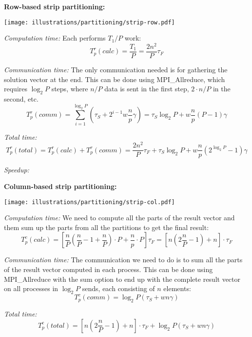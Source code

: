 \noindent\textbf{Row-based strip partitioning:}

\begin{center}
  \texttt{[image: illustrations/partitioning/strip-row.pdf]}
\end{center}

\emph{Computation time:} Each performs $T_1/P$ work:
\[
  T_p^r(calc) = \frac{T_1}{P} = \frac{2n^2}{P} \tau_F
\]

\emph{Communication time:} The only communication needed is for gathering the solution vector at the end. This can be done using MPI\_Allreduce, which requires $\log_2 P$ steps, where $n/P$ data is sent in the first step, $2\cdot n/P$ in the second, etc.
\[
  T_p^r(comm) = \sum_{i=1}^{\log_2 P} \left( \tau_S + 2^{i-1}w \frac{n}{p} \gamma \right)
  = \tau_S \log_2 P + w \frac{n}{p} \left( P-1 \right) \gamma
\]

\emph{Total time:}
\[
  T_p^r (total) = T_p^r(calc) + T_p^r(comm) =  \frac{2n^2}{P} \tau_F + \tau_S \log_2 P + w \frac{n}{p} \left( 2^{\log_2 P}-1 \right) \gamma
\]

\emph{Speedup:}









\noindent\textbf{Column-based strip partitioning:}

\begin{center}
  \texttt{[image: illustrations/partitioning/strip-col.pdf]}
\end{center}

\emph{Computation time:} We need to compute all the parts of the result vector and them sum up the parts from all the partitions to get the final result:
\[
  T_p^c(calc) = \left[ \frac{n}{P} \left( \frac{n}{P} - 1 + \frac{n}{P} \right) \cdot P + \frac{n}{p}\cdot P \right] \tau_F
  = \left[ n \left( 2 \frac{n}{P} - 1 \right) + n \right] \cdot \tau_F
\]

\emph{Communication time:} The communication we need to do is to sum all the parts of the result vector computed in each process. This can be done using MPI\_Allreduce with the sum option to end up with the complete result vector on all processes in $\log_2 P$ sends, each consisting of $n$ elements:
\begin{equation}
  T_p^c(comm) = \log_2 P \left( \tau_S + wn\gamma \right)
\end{equation}

\emph{Total time:}
\[
  T_p^c (total) = \left[ n \left( 2 \frac{n}{P} - 1 \right) + n \right] \cdot \tau_F + \log_2 P \left( \tau_S + wn\gamma \right)
\]






